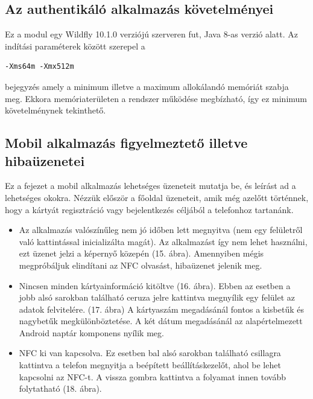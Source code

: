 \subsection{Az authentikáló alkalmazás követelményei}

Ez a modul egy Wildfly 10.1.0 verziójú szerveren fut, Java 8-as verzió alatt. Az indítási paraméterek között szerepel a
\begin{verbatim}
-Xms64m -Xmx512m 
\end{verbatim}
bejegyzés amely a minimum illetve a maximum allokálandó memóriát szabja meg. Ekkora memóriaterületen a rendszer működése megbízható, így ez minimum követelménynek tekinthető.


\subsection{Mobil alkalmazás figyelmeztető illetve hibaüzenetei}
Ez a fejezet a mobil alkalmazás lehetséges üzeneteit mutatja be, és leírást ad a lehetséges okokra. Nézzük először a főoldal üzeneteit, amik még azelőtt történnek, hogy a kártyát regisztráció vagy bejelentkezés céljából a telefonhoz tartanánk.
\begin{itemize}
\item Az alkalmazás valószínűleg nem jó időben lett megnyitva (nem egy felületről való kattintással inicializálta magát). Az alkalmazást így nem lehet használni, ezt üzenet jelzi a képernyő közepén (15. ábra). Amennyiben mégis megpróbáljuk elindítani az NFC olvasást, hibaüzenet jelenik meg.
\item Nincsen minden kártyainformáció kitöltve (16. ábra). Ebben az esetben a jobb alsó sarokban található ceruza jelre kattintva megnyílik egy felület az adatok felvitelére. (17. ábra)
A kártyaszám megadásánál fontos a kisbetűk és nagybetűk megkülönböztetése. A két dátum megadásánál az alapértelmezett Android naptár komponens nyílik meg.
\item NFC ki van kapcsolva. Ez esetben bal alsó sarokban található csillagra kattintva a telefon megnyitja a beépített beállításkezelőt, ahol be lehet kapcsolni az NFC-t. A vissza gombra kattintva a folyamat innen tovább folytatható (18. ábra).
\end{itemize}

